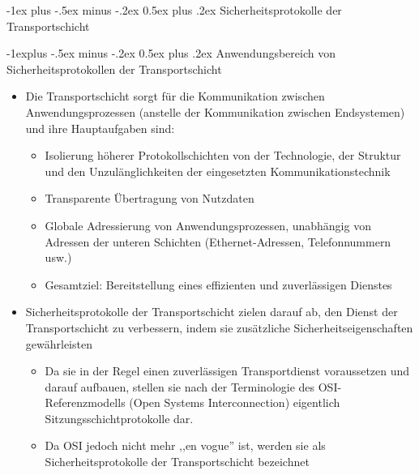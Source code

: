 \documentclass[a4paper]{article}
\makeatletter
\renewcommand{\section}{\@startsection{section}{1}{0mm}%
 {-1ex plus -.5ex minus -.2ex}%
 {0.5ex plus .2ex}%
 {\normalfont\large\bfseries}}
\renewcommand{\subsection}{\@startsection{subsection}{2}{0mm}%
 {-1explus -.5ex minus -.2ex}%
 {0.5ex plus .2ex}%
 {\normalfont\normalsize\bfseries}}
\makeatother
\begin{document}
\begin{multicols}{3}
    \section{Sicherheitsprotokolle der
      Transportschicht}


    \subsection{Anwendungsbereich von Sicherheitsprotokollen der
        Transportschicht}

    \begin{itemize}
        \item
              Die Transportschicht sorgt für die Kommunikation zwischen
              Anwendungsprozessen (anstelle der Kommunikation zwischen Endsystemen)
              und ihre Hauptaufgaben sind:

              \begin{itemize}
                  \item
                        Isolierung höherer Protokollschichten von der Technologie, der
                        Struktur und den Unzulänglichkeiten der eingesetzten
                        Kommunikationstechnik
                  \item
                        Transparente Übertragung von Nutzdaten
                  \item
                        Globale Adressierung von Anwendungsprozessen, unabhängig von
                        Adressen der unteren Schichten (Ethernet-Adressen, Telefonnummern
                        usw.)
                  \item
                        Gesamtziel: Bereitstellung eines effizienten und zuverlässigen
                        Dienstes
              \end{itemize}
        \item
              Sicherheitsprotokolle der Transportschicht zielen darauf ab, den
              Dienst der Transportschicht zu verbessern, indem sie zusätzliche
              Sicherheitseigenschaften gewährleisten

              \begin{itemize}
                  \item
                        Da sie in der Regel einen zuverlässigen Transportdienst voraussetzen
                        und darauf aufbauen, stellen sie nach der Terminologie des
                        OSI-Referenzmodells (Open Systems Interconnection) eigentlich
                        Sitzungsschichtprotokolle dar.
                  \item
                        Da OSI jedoch nicht mehr ,,en vogue'' ist, werden sie als
                        Sicherheitsprotokolle der Transportschicht bezeichnet
              \end{itemize}
    \end{itemize}



\end{multicols}
\end{document}
